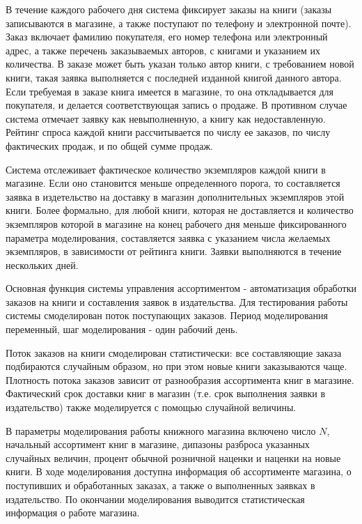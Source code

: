 \documentclass[final,12pt]{article}
\begin{document}
В течение каждого рабочего дня система фиксирует заказы на книги (заказы записываются в магазине, а также поступают по телефону и электронной почте). Заказ включает фамилию покупателя, его номер телефона или электронный адрес, а также перечень заказываемых авторов, с книгами и указанием их количества. В заказе может быть указан только автор книги, с требованием новой книги, такая заявка выполняется с последней изданной книгой данного автора. Если требуемая в заказе книга имеется в магазине, то она откладывается для покупателя, и делается соответствующая запись о продаже. В противном случае система отмечает заявку как невыполненную, а книгу как недоставленную. Рейтинг спроса каждой книги рассчитывается по числу ее заказов, по числу фактических продаж, и по общей сумме продаж. 

Система отслеживает фактическое количество экземпляров каждой книги в магазине. Если оно становится меньше определенного порога, то составляется заявка в издетельство на доставку в магазин дополнительных экземпляров этой книги. Более формально, для любой книги, которая не доставляется и количество экземпляров которой в магазине на конец рабочего дня меньше фиксированного параметра моделирования, составляется заявка с указанием числа желаемых экземпляров, в зависимости от рейтинга книги. Заявки выполняются в течение нескольких дней.

Основная функция системы управления ассортиментом - автоматизация обработки заказов на книги и составления заявок в издательства. Для тестирования работы системы смоделирован поток поступающих заказов. Период моделирования переменный, шаг моделирования - один рабочий день.

Поток заказов на книги смоделирован статистически: все составляющие заказа подбираются случайным образом, но при этом новые книги заказываются чаще. Плотность потока заказов зависит от разнообразия ассортимента книг в магазине. Фактический срок доставки книг в магазин (т.е. срок выполнения заявки в издательство) также моделируется с помощью случайной величины.

В параметры моделирования работы книжного магазина включено число \(N\), начальный ассортимент книг в магазине, дипазоны разброса указанных случайных величин, процент обычной розничной наценки и наценки на новые книги. В ходе моделирования доступна информация об ассортименте магазина, о поступивших и обработанных заказах, а также о выполненных заявках в издательство. По окончании моделирования выводится статистическая информация о работе магазина.
\end{document}
